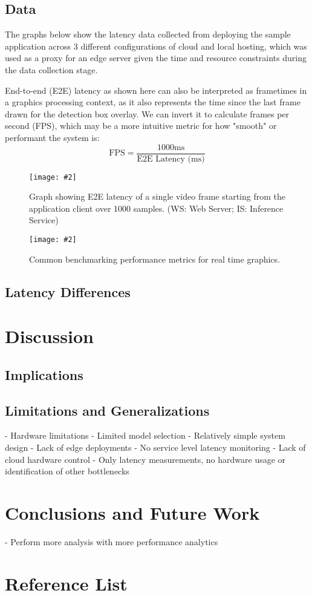\documentclass[11pt]{article}
\newcommand{\capfigure}[3][0.5] {
    \begin{figure}[H]
    \centering
    \texttt{[image: \#2]}
    \caption{#3}
    \end{figure}
}
\begin{document}
\subsection{Data}
The graphs below show the latency data collected from deploying the sample application across 3
different configurations of cloud and local hosting, which was used as a proxy for an edge server 
given the time and resource constraints during the data collection stage. \newline

End-to-end (E2E) latency as shown here can also be interpreted as frametimes in a graphics processing 
context, as it also represents the time since the last frame drawn for the detection box overlay.
We can invert it to calculate frames per second (FPS), which may be a more intuitive metric for
how "smooth" or performant the system is:
$$
\text{FPS}=\frac{1000\text{ms}}{\text{E2E Latency (ms)}}
$$

\capfigure[]{images/latency1}{Graph showing E2E latency of a single 
video frame starting from the application client over 1000 samples. 
(WS: Web Server; IS: Inference Service)}
\capfigure[]{images/latency2}{Common benchmarking performance metrics for real time graphics.}
\subsection{Latency Differences}

\newpage
\section{Discussion}
\subsection{Implications}
\subsection{Limitations and Generalizations}
- Hardware limitations
- Limited model selection
- Relatively simple system design
- Lack of edge deployments
- No service level latency monitoring
- Lack of cloud hardware control 
- Only latency measurements, no hardware usage or identification of other bottlenecks

\newpage
\section{Conclusions and Future Work}
- Perform more analysis with more performance analytics

\newpage
\section{Reference List}
\end{document}
